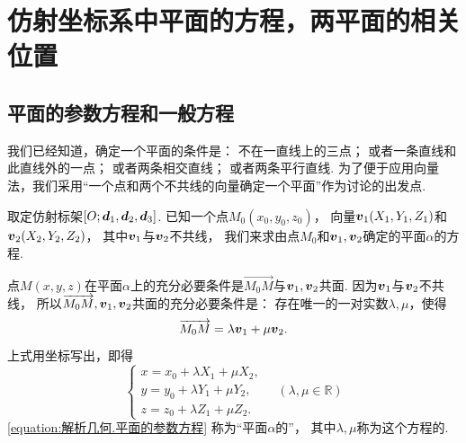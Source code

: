\section{仿射坐标系中平面的方程，两平面的相关位置}
\subsection{平面的参数方程和一般方程}
我们已经知道，确定一个平面的条件是：
不在一直线上的三点；
或者一条直线和此直线外的一点；
或者两条相交直线；
或者两条平行直线.
为了便于应用向量法，我们采用“一个点和两个不共线的向量确定一个平面”作为讨论的出发点.

取定仿射标架\([O;\boldsymbol{d}_1,\boldsymbol{d}_2,\boldsymbol{d}_3]\).
已知一个点\(M_0(x_0,y_0,z_0)\)，
向量\(\boldsymbol{v}_1(X_1,Y_1,Z_1)\)和\(\boldsymbol{v}_2(X_2,Y_2,Z_2)\)，
其中\(\boldsymbol{v}_1\)与\(\boldsymbol{v}_2\)不共线，
我们来求由点\(M_0\)和\(\boldsymbol{v}_1,\boldsymbol{v}_2\)确定的平面\(\alpha\)的方程.

点\(M(x,y,z)\)在平面\(\alpha\)上的充分必要条件是\(\vec{M_0 M}\)与\(\boldsymbol{v}_1,\boldsymbol{v}_2\)共面.
因为\(\boldsymbol{v}_1\)与\(\boldsymbol{v}_2\)不共线，
所以\(\overrightarrow{M_0 M},\boldsymbol{v}_1,\boldsymbol{v}_2\)共面的充分必要条件是：
存在唯一的一对实数\(\lambda,\mu\)，使得\begin{equation*}
	\overrightarrow{M_0 M} = \lambda \boldsymbol{v}_1 + \mu \boldsymbol{v}_2.
\end{equation*}
上式用坐标写出，即得
\begin{equation}\label{equation:解析几何.平面的参数方程}
	\left\{ \begin{array}{l}
		x = x_0 + \lambda X_1 + \mu X_2, \\
		y = y_0 + \lambda Y_1 + \mu Y_2, \\
		z = z_0 + \lambda Z_1 + \mu Z_2.
	\end{array} \right.
	\quad(\lambda,\mu\in\mathbb{R})
\end{equation}
\cref{equation:解析几何.平面的参数方程}
称为“平面\(\alpha\)的”，
其中\(\lambda,\mu\)称为这个方程的.

